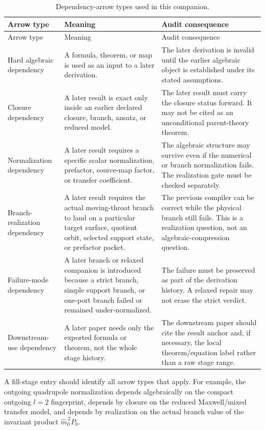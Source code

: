 \begin{longtable}{L{0.18\textwidth}L{0.26\textwidth}L{0.42\textwidth}}
\caption{Dependency-arrow types used in this companion.}\label{tab:dependency-arrow-types}\\
\toprule
Arrow type & Meaning & Audit consequence \\
\midrule
\endfirsthead
\toprule
Arrow type & Meaning & Audit consequence \\
\midrule
\endhead
Hard algebraic dependency & A formula, theorem, or map is used as an input to a later derivation. & The later derivation is invalid until the earlier algebraic object is established under its stated assumptions. \\
\addlinespace
Closure dependency & A later result is exact only inside an earlier declared closure, branch, ansatz, or reduced model. & The later result must carry the closure status forward.  It may not be cited as an unconditional parent-theory theorem. \\
\addlinespace
Normalization dependency & A later result requires a specific scalar normalization, prefactor, source-map factor, or transfer coefficient. & The algebraic structure may survive even if the numerical or branch normalization fails.  The realization gate must be checked separately. \\
\addlinespace
Branch-realization dependency & A later result requires the actual moving-throat branch to land on a particular target surface, quotient orbit, selected support state, or prefactor packet. & The previous compiler can be correct while the physical branch still fails.  This is a realization question, not an algebraic-compression question. \\
\addlinespace
Failure-mode dependency & A later branch or relaxed companion is introduced because a strict branch, simple support branch, or one-port branch failed or remained under-normalized. & The failure must be preserved as part of the derivation history.  A relaxed repair may not erase the strict verdict. \\
\addlinespace
Downstream-use dependency & A later paper needs only the exported formula or theorem, not the whole stage history. & The downstream paper should cite the result anchor and, if necessary, the local theorem/equation label rather than a raw stage range. \\
\bottomrule
\end{longtable}

A fill-stage entry should identify all arrow types that apply.  For example, the outgoing quadrupole normalization depends algebraically on the compact outgoing \(l=2\) fingerprint, depends by closure on the reduced Maxwell/mixed transfer model, and depends by realization on the actual branch value of the invariant product \(\widehat m_0^{\,2}P_0\).

